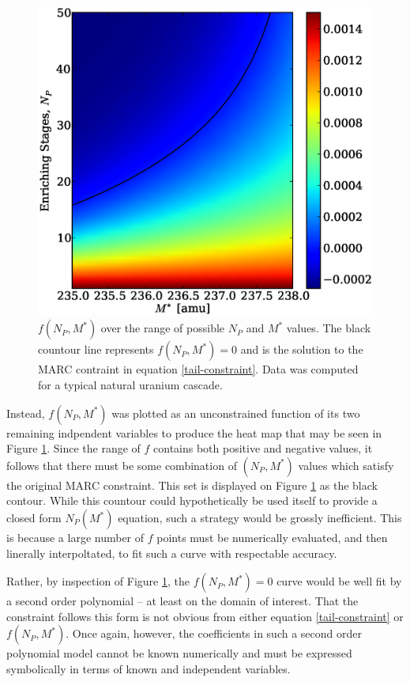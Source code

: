 \documentclass[preprint,12pt]{elsarticle}
\begin{document}
\begin{figure}[htpb]
\begin{center}
\includegraphics[scale=0.5]{np_constraint.eps}
\caption{$f(N_P, M^*)$ over the range of possible $N_P$ and $M^*$ values.  The black
countour line represents $f(N_P, M^*)=0$ and is the solution to the MARC contraint
in equation \ref{tail-constraint}. 
Data was computed for a typical natural uranium cascade.}
\label{np_contraint_fig}
\end{center}
\end{figure}

Instead, $f(N_P,M^*)$ was plotted as an unconstrained function of its two remaining 
indpendent variables to produce the heat map that may be seen in Figure 
\ref{np_contraint_fig}.  Since the range of $f$ contains both positive and negative
values, it follows that there must be some combination of $(N_P,M^*)$ values which
satisfy the original MARC constraint.  This set is displayed on Figure 
\ref{np_contraint_fig} as the black contour.  While this countour could hypothetically
be used itself to provide a closed form $N_P(M^*)$ equation, such a strategy would 
be grossly inefficient.  This is because a large number of $f$ points must be 
numerically evaluated, and then linerally interpoltated, to fit such a curve with
respectable accuracy.

Rather, by inspection of Figure \ref{np_contraint_fig}, the $f(N_P, M^*)=0$ curve 
would be well fit by a second order polynomial -- at least on the domain of interest.
That the constraint follows this form is not obvious from either equation 
\ref{tail-constraint} or $f(N_P,M^*)$.  Once again, however, the coefficients in 
such a second order polynomial model cannot be known numerically and must be 
expressed symbolically in terms of known and independent variables.
\end{document}
